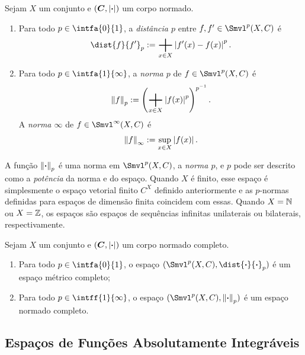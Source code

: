 \begin{defi}
Sejam $X$ um conjunto e $(\bm C, \left\vert{\bm{\cdot}}\right\vert)$ um corpo normado.
	\begin{enumerate}
	\item Para todo $p \in \intfa{0}{1}$, a \emph{distância $p$} entre $f,f' \in \Smvl^p(X,C)$ é
	\begin{equation*}
	\dist{f}{f'}_p :=  \sum_{x \in X} \abs{f'(x) - f(x)}^p.
	\end{equation*}

	\item Para todo $p \in \intfa{1}{\infty}$, a \emph{norma $p$} de $f \in \Smvl^p(X,C)$ é
	\begin{equation*}
	\nor{f}_p := \left( \sum_{x \in X} \abs{f(x)}^p \right)^{p\inv}.
	\end{equation*}
A \emph{norma $\infty$} de $f \in \Smvl^\infty(X,C)$ é
	\begin{equation*}
	\left\Vert{f}\right\Vert_\infty := \sup_{x \in X} \left\vert{f(x)}\right\vert.
	\end{equation*}
	\end{enumerate}
\end{defi}

A função $\left\Vert{\bm{\cdot}}\right\Vert_p$ é uma norma em $\Smvl^p(X,C)$, a \emph{norma $p$}, e $p$ pode ser descrito como a \emph{potência} da norma e do espaço. Quando $X$ é finito, esse espaço é simplesmente o espaço vetorial finito $C^X$ definido anteriormente e as $p$-normas definidas para espaços de dimensão finita coincidem com essas. Quando $X=\mathbb{N}$ ou $X=\mathbb{Z}$, os espaços são espaços de sequências infinitas unilaterais ou bilaterais, respectivamente.

\begin{prop}
Sejam $X$ um conjunto e $(\bm C, \left\vert{\bm{\cdot}}\right\vert)$ um corpo normado completo.
	\begin{enumerate}
	\item Para todo $p \in \intfa{0}{1}$, o espaço $(\Smvl^p(X,C),\dist{\var}{\var}_p)$ é um espaço métrico completo;

	\item Para todo $p \in \intff{1}{\infty}$, o espaço $(\Smvl^p(X,C),\nor{\var}_p)$ é um espaço normado completo.
	\end{enumerate}
\end{prop}


\subsection{Espaços de Funções Absolutamente Integráveis}

